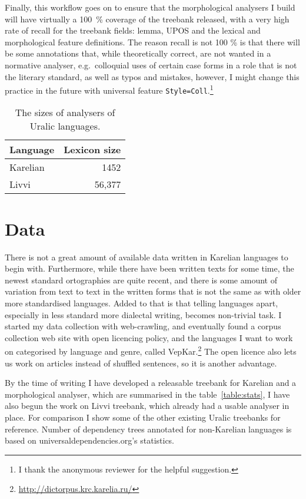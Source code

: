 \documentclass[11pt]{article}
\begin{document}
Finally, this workflow goes on to ensure that the morphological analysers I
build will have virtually a 100~\% coverage of the treebank released, with a
very high rate of recall for the treebank fields: lemma, UPOS and the lexical
and morphological feature definitions. The reason recall is not 100 \% is that
there will be some annotations that, while theoretically correct, are not
wanted in a normative analyser, e.g.\ colloquial uses of certain case forms in
a role that is not the literary standard, as well as typos and mistakes,
however, I might change this practice in the future with universal feature
\texttt{Style=Coll}.\footnote{I thank the anonymous reviewer for the helpful
suggestion.}

\begin{table}
    \begin{centering}
    \begin{tabular}{lr}
        \toprule
        Language & Lexicon size \\
        \midrule
        Karelian & 1452 \\
        Livvi & 56,377 \\
        \bottomrule
    \end{tabular}
    \caption{The sizes of analysers of Uralic languages.\label{table:analysers}}
    \end{centering}
\end{table}

\section{Data}
\label{sec:data}

There is not a great amount of available data written in Karelian languages to
begin with. Furthermore, while there have been written texts for some time, the
newest standard ortographies are quite recent, and there is some amount of
variation from text to text in the written forms that is not the same as with
older more standardised languages. Added to that is that telling languages
apart, especially in less standard more dialectal writing, becomes non-trivial
task. I started my data collection with web-crawling, and eventually found a
corpus collection web site with open licencing policy, and the languages I want
to work on categorised by language and genre, called
VepKar.\footnote{\url{http://dictorpus.krc.karelia.ru/}} The open licence also
lets us work on articles instead of shuffled sentences, so it is another
advantage.

By the time of writing I have developed a releasable treebank for Karelian and
a morphological analyser, which are summarised in the table~\ref{table:stats},
I have also begun the work on Livvi treebank, which already had a usable
analyser in place. For comparison I show some of the other existing Uralic
treebanks for reference. Number of dependency trees annotated for
non-Karelian languages is based on universaldependencies.org's statistics.
\end{document}
